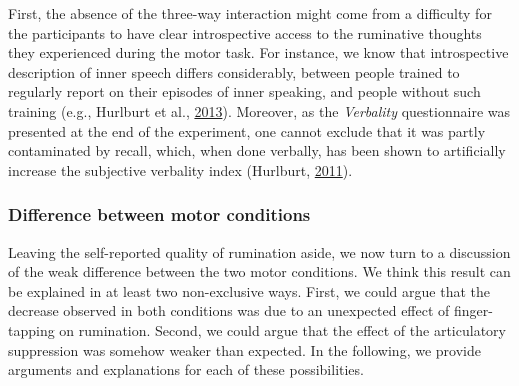 \documentclass[a4paper,12pt,twoside,onecolumn,openright,final,oldfontcommands]{memoir}
\begin{document}
First, the absence of the three-way interaction might come from a difficulty for the participants to have clear introspective access to the ruminative thoughts they experienced during the motor task. For instance, we know that introspective description of inner speech differs considerably, between people trained to regularly report on their episodes of inner speaking, and people without such training (e.g., Hurlburt et al., \protect\hyperlink{ref-Hurlburt2013}{2013}). Moreover, as the \emph{Verbality} questionnaire was presented at the end of the experiment, one cannot exclude that it was partly contaminated by recall, which, when done verbally, has been shown to artificially increase the subjective verbality index (Hurlburt, \protect\hyperlink{ref-Hurlburt2011}{2011}).

\hypertarget{difference-between-motor-conditions}{%
\subsubsection{Difference between motor conditions}\label{difference-between-motor-conditions}}

Leaving the self-reported quality of rumination aside, we now turn to a discussion of the weak difference between the two motor conditions. We think this result can be explained in at least two non-exclusive ways. First, we could argue that the decrease observed in both conditions was due to an unexpected effect of finger-tapping on rumination. Second, we could argue that the effect of the articulatory suppression was somehow weaker than expected. In the following, we provide arguments and explanations for each of these possibilities.
\end{document}
